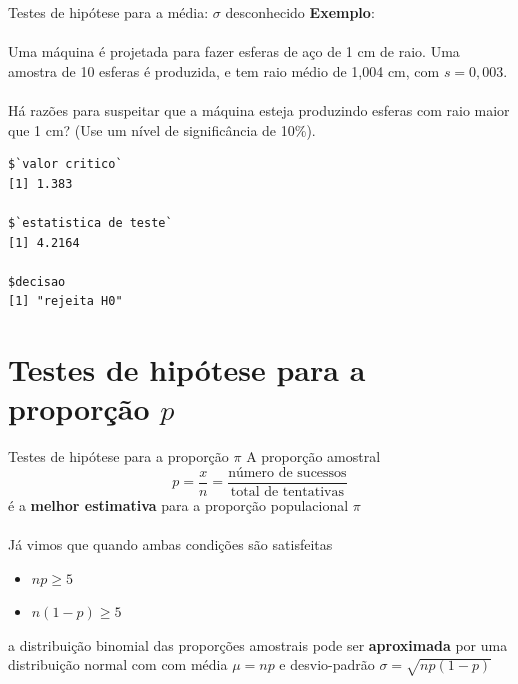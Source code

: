 \documentclass[10pt]{beamer}\usepackage[]{graphicx}\usepackage[]{color}
\makeatletter
\newenvironment{kframe}{%
 \def\at@end@of@kframe{}%
 \ifinner\ifhmode%
  \def\at@end@of@kframe{\end{minipage}}%
  \begin{minipage}{\columnwidth}%
 \fi\fi%
 \def\FrameCommand##1{\hskip\@totalleftmargin \hskip-\fboxsep
 \colorbox{shadecolor}{##1}\hskip-\fboxsep
     \hskip-\linewidth \hskip-\@totalleftmargin \hskip\columnwidth}%
 \MakeFramed {\advance\hsize-\width
   \@totalleftmargin\z@ \linewidth\hsize
   \@setminipage}}%
 {\par\unskip\endMakeFramed%
 \at@end@of@kframe}
\newenvironment{knitrout}{}{} %
\theoremstyle{definition}
\makeatother
\begin{document}
\begin{frame}[fragile]{Testes de hipótese para a média: $\sigma$ desconhecido}
  \textbf{Exemplo}: \\~\\
  Uma máquina é projetada para fazer esferas de aço de 1 cm de raio. Uma
  amostra de 10 esferas é produzida, e tem raio médio de 1,004
  cm, com $s = 0,003$. \\~\\
  Há razões para suspeitar que a máquina esteja produzindo esferas com
  raio maior que 1 cm? (Use um nível de significância de 10\%).
  \pause
\begin{knitrout}\footnotesize
{}\color{fgcolor}\begin{kframe}
\begin{verbatim}
$`valor critico`
[1] 1.383

$`estatistica de teste`
[1] 4.2164

$decisao
[1] "rejeita H0"
\end{verbatim}
\end{kframe}
\end{knitrout}
\end{frame}

\section{Testes de hipótese para a proporção $p$}

\begin{frame}{Testes de hipótese para a proporção $\pi$}
  A proporção amostral
  \begin{equation*}
    p = \frac{x}{n} = \frac{\text{número de sucessos}}{\text{total de
        tentativas}}
  \end{equation*}
  é a \textbf{melhor estimativa} para a proporção populacional $\pi$
  \\~\\
  Já vimos que quando ambas condições são satisfeitas
  \begin{itemize}
  \item $np \geq 5$
  \item $n(1-p) \geq 5$
  \end{itemize}
  a distribuição binomial das proporções amostrais pode ser
  \textbf{aproximada} por uma distribuição normal com com média $\mu =
  np$ e desvio-padrão $\sigma = \sqrt{np(1-p)}$
\end{frame}
\end{document}
